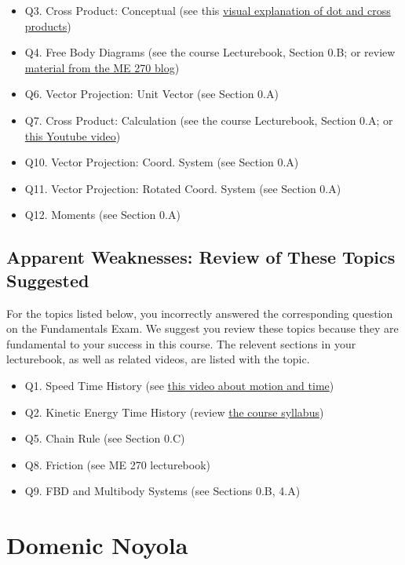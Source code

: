 \documentclass[11pt,letterpaper]{article}\usepackage[]{graphicx}\usepackage[]{color}
\begin{document}
\begin{itemize}\item Q3. Cross Product: Conceptual (see this \href{https://www.youtube.com/watch?v=h0NJK4mEIJU&t=8s}{visual explanation of dot and cross products})
\item Q4. Free Body Diagrams (see the course Lecturebook, Section 0.B; or review \href{https://www.purdue.edu/statics/}{material from the ME 270 blog})
\item Q6. Vector Projection: Unit Vector (see Section 0.A)
\item Q7. Cross Product: Calculation (see the course Lecturebook, Section 0.A; or \href{https://www.youtube.com/watch?v=DmPxjmymM7k}{this Youtube video})
\item Q10. Vector Projection: Coord. System (see Section 0.A)
\item Q11. Vector Projection: Rotated Coord. System (see Section 0.A)
\item Q12. Moments (see Section 0.A)
\end{itemize}\subsection*{Apparent Weaknesses: Review of These Topics Suggested}
For the topics listed below, you incorrectly answered the corresponding question on the Fundamentals Exam.  We suggest you review these topics because they are fundamental to your success in this course.  The relevent sections in your lecturebook, as well as related videos, are listed with the topic.

\begin{itemize}\item Q1. Speed Time History (see \href{https://www.youtube.com/watch?v=lZPtFDXYQRU}{this video about motion and time})
\item Q2. Kinetic Energy Time History (review \href{https://www.purdue.edu/freeform/dynamics/wp-content/uploads/sites/4/2018/01/Syllabus-Spring-2018.pdf}{the course syllabus})
\item Q5. Chain Rule (see Section 0.C)
\item Q8. Friction (see ME 270 lecturebook)
\item Q9. FBD and Multibody Systems (see Sections 0.B, 4.A)
\end{itemize}

\pagebreak
\section*{Domenic Noyola}
\end{document}
